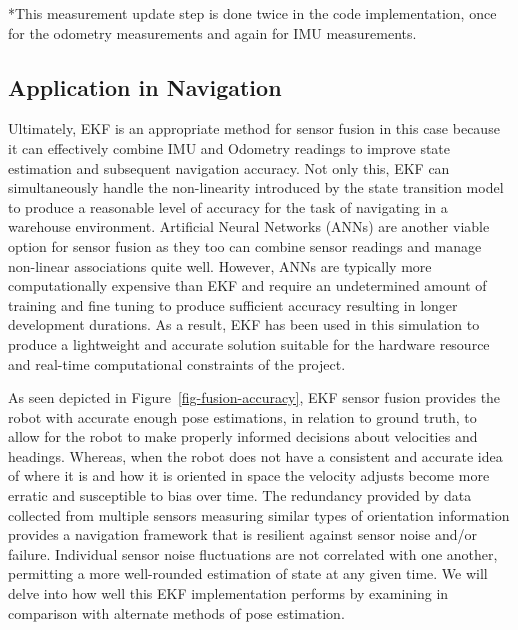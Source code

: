 \documentclass[
  letterpaper,
  DIV=11,
  numbers=noendperiod]{scrartcl}
\begin{document}
*This measurement update step is done twice in the code implementation,
once for the odometry measurements and again for IMU measurements.

\hypertarget{application-in-navigation}{%
\subsection{Application in Navigation}\label{application-in-navigation}}

Ultimately, EKF is an appropriate method for sensor fusion in this case
because it can effectively combine IMU and Odometry readings to improve
state estimation and subsequent navigation accuracy. Not only this, EKF
can simultaneously handle the non-linearity introduced by the state
transition model to produce a reasonable level of accuracy for the task
of navigating in a warehouse environment. Artificial Neural Networks
(ANNs) are another viable option for sensor fusion as they too can
combine sensor readings and manage non-linear associations quite well.
However, ANNs are typically more computationally expensive than EKF and
require an undetermined amount of training and fine tuning to produce
sufficient accuracy resulting in longer development durations. As a
result, EKF has been used in this simulation to produce a lightweight
and accurate solution suitable for the hardware resource and real-time
computational constraints of the project.

As seen depicted in Figure~\ref{fig-fusion-accuracy}, EKF sensor fusion
provides the robot with accurate enough pose estimations, in relation to
ground truth, to allow for the robot to make properly informed decisions
about velocities and headings. Whereas, when the robot does not have a
consistent and accurate idea of where it is and how it is oriented in
space the velocity adjusts become more erratic and susceptible to bias
over time. The redundancy provided by data collected from multiple
sensors measuring similar types of orientation information provides a
navigation framework that is resilient against sensor noise and/or
failure. Individual sensor noise fluctuations are not correlated with
one another, permitting a more well-rounded estimation of state at any
given time. We will delve into how well this EKF implementation performs
by examining in comparison with alternate methods of pose estimation.
\end{document}
